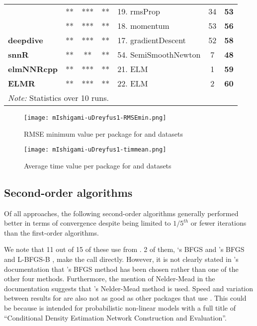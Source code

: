 \begin{Schunk}
\begin{table}
\begin{tabular}[t]{>{}lccclc>{}c}
 & ** & *** & ** & 19. rmsProp & 34 & \textbf{53}\\

 & ** & *** & ** & 18. momentum & 53 & \textbf{56}\\

\multirow{-4}{*}{\raggedright\arraybackslash \textbf{deepdive}} & ** & *** & ** & 17. gradientDescent & 52 & \textbf{58}\\
\cmidrule{1-7}
\textbf{snnR} & ** & ** & ** & 54. SemiSmoothNewton & 7 & \textbf{48}\\
\cmidrule{1-7}
\textbf{elmNNRcpp} & ** & *** & ** & 21. ELM & 1 & \textbf{59}\\
\cmidrule{1-7}
\textbf{ELMR} & ** & *** & ** & 22. ELM & 2 & \textbf{60}\\
\bottomrule
\multicolumn{7}{l}{\rule{0pt}{1em}\textit{Note: } Statistics over 10 runs.}\\
\end{tabular}
\end{table}

\end{Schunk}

\begin{figure}
  \centering
  \texttt{[image: mIshigami-uDreyfus1-RMSEmin.png]}
        \label{fig:Allpkg:RMSEmin}
        \caption{RMSE minimum value per package for 
        and  datasets}
\end{figure}

\begin{figure}
  \centering
  \texttt{[image: mIshigami-uDreyfus1-timmean.png]}
        \label{fig:Allpkg:timemean}
        \caption{Average time value per package for 
        and  datasets}
\end{figure}

\hypertarget{second-order-algorithms}{%
\subsection{Second-order algorithms}\label{second-order-algorithms}}

Of all approaches, the following second-order algorithms generally
performed better in terms of convergence despite being limited to
\(1/5^{th}\) or fewer iterations than the first-order algorithms.

We note that 11 out of 15 of these  use
 from . 2 of them, `s BFGS
\citep{R-CaDENCE} and 's BFGS and L-BFGS-B
\citep{R-validann}, make the call directly. However, it is not clearly
stated in 's documentation that 's BFGS method
has been chosen rather than one of the other four methods. Furthermore,
the mention of Nelder-Mead in the documentation suggests that
's Nelder-Mead method is used. Speed and variation between
results for  are also not as good as other packages that
use . This could be because  is intended for
probabilistic non-linear models with a full title of ``Conditional
Density Estimation Network Construction and Evaluation''.

